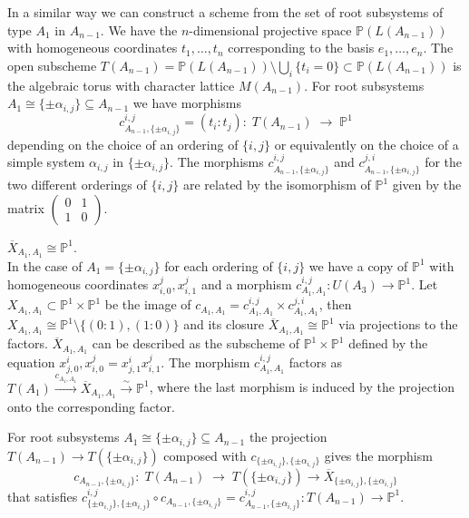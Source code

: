 \documentclass[ALCO,ThmDefs,Unicode,epreuves]{cedram}
\def\P{\mathds P}
\begin{document}
In a similar way we can construct a scheme from the set of root subsystems 
of type $A_1$ in $A_{n-1}$. We have the $n$-dimensional projective space 
$\P(L(A_{n-1}))$ with homogeneous coordinates $t_1,\ldots,t_n$ corresponding 
to the basis $e_1,\ldots,e_n$. The open subscheme 
$T(A_{n-1})=\P(L(A_{n-1}))\setminus\bigcup_i\{t_i=0\}\subset \P(L(A_{n-1}))$ 
is the algebraic torus with character lattice $M(A_{n-1})$. For root subsystems 
$A_1\cong\{\pm\alpha_{i,j}\}\subseteq A_{n-1}$ we have morphisms
\[
c_{A_{n-1},\{\pm\alpha_{i,j}\}}^{i,j}=(t_i:t_j)\colon\;T(A_{n-1})\;\to\;\P^1
\]
depending on the choice of an ordering of $\{i,j\}$ or equivalently on the choice 
of a simple system $\alpha_{i,j}$ in $\{\pm\alpha_{i,j}\}$.
The morphisms $c_{A_{n-1},\{\pm\alpha_{i,j}\}}^{i,j}$ and 
$c_{A_{n-1},\{\pm\alpha_{i,j}\}}^{j,i}$ for the two different orderings of
$\{i,j\}$ are related by the isomorphism of $\P^1$ given by the matrix
$\left(\begin{smallmatrix}0&1\\1&0\end{smallmatrix}\right)$.

\begin{exam}\label{ex:xA1A1} $\overline{X}_{A_1,A_1}\cong\P^1$.\\
In the case of $A_1=\{\pm\alpha_{i,j}\}$ for each ordering of $\{i,j\}$ 
we have a copy of $\P^1$ with homogeneous coordinates $x^j_{i,0},x^j_{i,1}$ 
and a morphism $c_{A_1,A_1}^{i,j}\colon U(A_3)\to\P^1$. 
Let $X_{A_1,A_1}\subset\P^1\times\P^1$ be the image of 
$c_{A_1,A_1}=c_{A_1,A_1}^{i,j}\times c_{A_1,A_1}^{j,i}$, 
then $X_{A_1,A_1}\cong\P^1\setminus\{(0:1),(1:0)\}$ and its closure 
$\overline{X}_{A_1,A_1}\cong\P^1$ via projections to the factors.
$\overline{X}_{A_1,A_1}$ can be described as the subscheme of $\P^1\times\P^1$ 
defined by the equation $x^i_{j,0},x^j_{i,0}=x^i_{j,1}x^j_{i,1}$.
The morphism $c_{A_1,A_1}^{i,j}$ factors as 
$T(A_1)\stackrel{c_{A_1,A_1}}{\longrightarrow}\overline{X}_{A_1,A_1}
\stackrel{\sim}{\to}\P^1$, where the last morphism is induced by the projection 
onto the corresponding factor.
\end{exam}

For root subsystems $A_1\cong\{\pm\alpha_{i,j}\}\subseteq A_{n-1}$ 
the projection $T(A_{n-1})\to T(\{\pm\alpha_{i,j}\})$ composed with
$c_{\{\pm\alpha_{i,j}\},\{\pm\alpha_{i,j}\}}$ gives the morphism
\[
c_{A_{n-1},\{\pm\alpha_{i,j}\}}\colon\;T(A_{n-1})\;\to\;T(\{\pm\alpha_{i,j}\})
\to\overline{X}_{\{\pm\alpha_{i,j}\},\{\pm\alpha_{i,j}\}}
\]
that satisfies $c_{\{\pm\alpha_{i,j}\},\{\pm\alpha_{i,j}\}}^{i,j}\circ 
c_{A_{n-1},\{\pm\alpha_{i,j}\}}=c_{A_{n-1},\{\pm\alpha_{i,j}\}}^{i,j}
\colon T(A_{n-1})\to\P^1$. 
 
\end{document}
